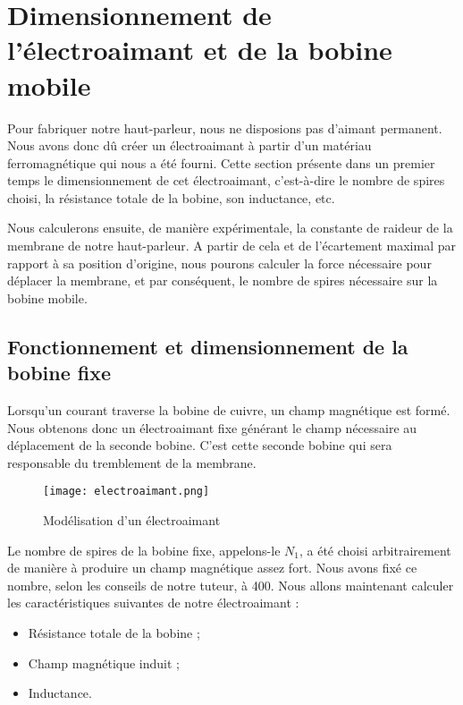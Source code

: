 

\section{Dimensionnement de l'électroaimant et de la bobine mobile}
Pour fabriquer notre haut-parleur, nous ne disposions pas d'aimant permanent. Nous avons donc
dû créer un électroaimant à partir d'un matériau ferromagnétique qui nous a été fourni.
Cette section présente dans un premier temps le dimensionnement de cet électroaimant, c'est-à-dire le
nombre de spires choisi, la résistance totale de la bobine, son inductance, etc.

Nous calculerons ensuite, de manière expérimentale, la constante de raideur de la membrane de
notre haut-parleur. A partir de cela et de l'écartement maximal par rapport à sa position d'origine, 
nous pourons calculer la force nécessaire pour déplacer la membrane, et par conséquent, le nombre
de spires nécessaire sur la bobine mobile.

\subsection{Fonctionnement et dimensionnement de la bobine fixe}
Lorsqu'un courant traverse la bobine de cuivre, un champ magnétique est formé.  Nous obtenons 
donc un électroaimant fixe générant le champ nécessaire au déplacement de la seconde bobine. 
C'est cette seconde bobine qui sera responsable du tremblement de la membrane.

\begin{figure}[ht!]
\centering
\texttt{[image: electroaimant.png]}
\caption{Modélisation d'un électroaimant}
\label{modélisation de l'électroaimant}
\end{figure}

Le nombre de spires de la bobine fixe, appelons-le $N_1$, a été choisi arbitrairement de manière à produire un
champ magnétique assez fort. Nous avons fixé ce nombre, selon les conseils de notre tuteur, à 400. 
Nous allons maintenant calculer les caractéristiques suivantes de notre électroaimant :

\begin{itemize}
	\item Résistance totale de la bobine ;
	\item Champ magnétique induit ;
	\item Inductance.
\end{itemize}

